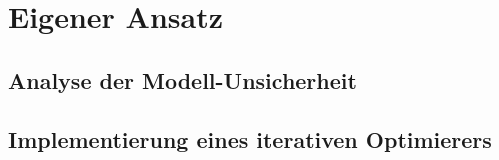 \chapter{Eigener Ansatz}
\section{Analyse der Modell-Unsicherheit}
\section{Implementierung eines iterativen Optimierers}